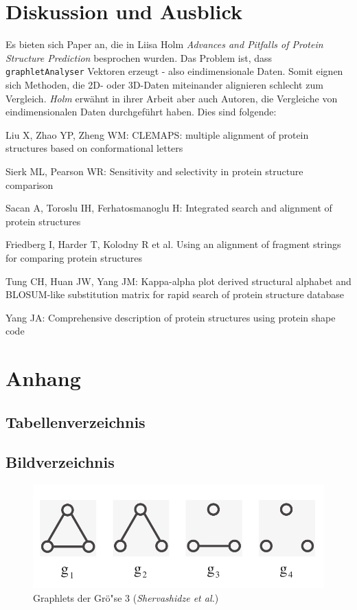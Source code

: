 \documentclass{report}
\begin{document}
\chapter{Diskussion und Ausblick}





Es bieten sich Paper an, die in Liisa Holm \textit{Advances and Pitfalls of Protein Structure Prediction} besprochen wurden. Das Problem ist, dass \texttt{graphletAnalyser} Vektoren erzeugt - also eindimensionale Daten. Somit eignen sich Methoden, die 2D- oder 3D-Daten miteinander alignieren schlecht zum Vergleich. \textit{Holm} erw\"ahnt in ihrer Arbeit aber auch Autoren, die Vergleiche von eindimensionalen Daten durchgef\"uhrt haben. Dies sind folgende:

Liu X, Zhao YP, Zheng WM: CLEMAPS: multiple alignment of protein structures based on conformational letters

Sierk ML, Pearson WR: Sensitivity and selectivity in protein structure comparison

Sacan A, Toroslu IH, Ferhatosmanoglu H: Integrated search and alignment of protein structures

Friedberg I, Harder T, Kolodny R et al. Using an alignment of fragment strings for comparing protein structures

Tung CH, Huan JW, Yang JM: Kappa-alpha plot derived structural alphabet and BLOSUM-like substitution matrix for rapid search of protein structure database






Yang JA: Comprehensive description of protein structures using protein shape code




\chapter{Anhang}

\section{Tabellenverzeichnis}

\section{Bildverzeichnis}

\begin{figure}[h]
\includegraphics[width =\linewidth]{3graphlets.pdf}
\caption{Graphlets der Gr\"o"se 3 (\textit{Shervashidze et al.})}
\label{fig:3graphlets}
\end{figure}
\end{document}
